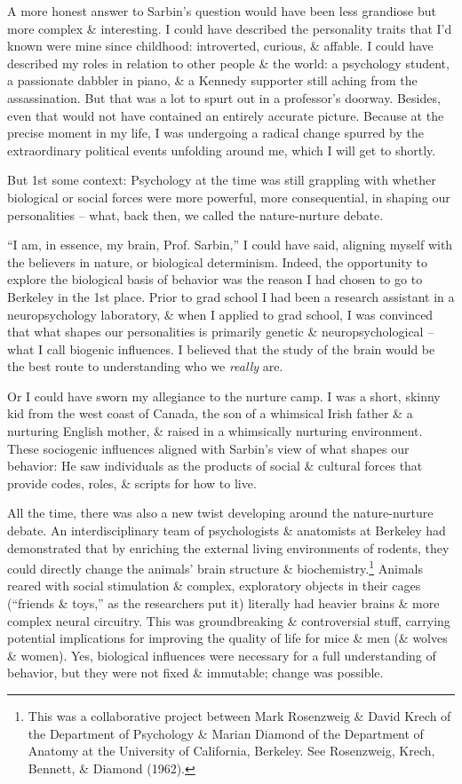 \documentclass{article}
\numberwithin{equation}{section}
\begin{document}
A more honest answer to Sarbin's question would have been less grandiose but more complex \& interesting. I could have described the personality traits that I'd known were mine since childhood: introverted, curious, \& affable. I could have described my roles in relation to other people \& the world: a psychology student, a passionate dabbler in piano, \& a Kennedy supporter still aching from the assassination. But that was a lot to spurt out in a professor's doorway. Besides, even that would not have contained an entirely accurate picture. Because at the precise moment in my life, I was undergoing a radical change spurred by the extraordinary political events unfolding around me, which I will get to shortly.

But 1st some context: Psychology at the time was still grappling with whether biological or social forces were more powerful, more consequential, in shaping our personalities -- what, back then, we called the nature-nurture debate.

``I am, in essence, my brain, Prof. Sarbin,'' I could have said, aligning myself with the believers in nature, or biological determinism. Indeed, the opportunity to explore the biological basis of behavior was the reason I had chosen to go to Berkeley in the 1st place. Prior to grad school I had been a research assistant in a neuropsychology laboratory, \& when I applied to grad school, I was convinced that what shapes our personalities is primarily genetic \& neuropsychological -- what I call biogenic influences. I believed that the study of the brain would be the best route to understanding who we \textit{really} are.

Or I could have sworn my allegiance to the nurture camp. I was a short, skinny kid from the west coast of Canada, the son of a whimsical Irish father \& a nurturing English mother, \& raised in a whimsically nurturing environment. These sociogenic influences aligned with Sarbin's view of what shapes our behavior: He saw individuals as the products of social \& cultural forces that provide codes, roles, \& scripts for how to live.

All the time, there was also a new twist developing around the nature-nurture debate. An interdisciplinary team of psychologists \& anatomists at Berkeley had demonstrated that by enriching the external living environments of rodents, they could directly change the animals' brain structure \& biochemistry.\footnote{This was a collaborative project between Mark Rosenzweig \& David Krech of the Department of Psychology \& Marian Diamond of the Department of Anatomy at the University of California, Berkeley. See Rosenzweig, Krech, Bennett, \& Diamond (1962).} Animals reared with social stimulation \& complex, exploratory objects in their cages (``friends \& toys,'' as the researchers put it) literally had heavier brains \& more complex neural circuitry. This was groundbreaking \& controversial stuff, carrying potential implications for improving the quality of life for mice \& men (\& wolves \& women). Yes, biological influences were necessary for a full understanding of behavior, but they were not fixed \& immutable; change was possible.
\end{document}
